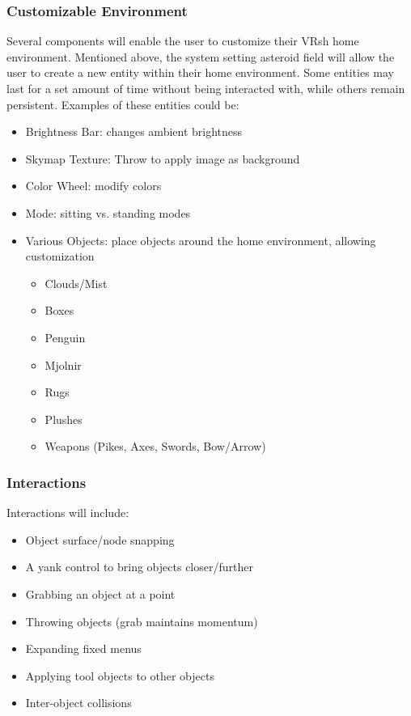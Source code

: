 \documentclass[titlepage,12pt]{article}
\newcommand\name{VRsh\xspace}
\begin{document}
\subsubsection{Customizable Environment}\label{sec:env}
Several components will enable the user to customize their \name home
environment. Mentioned above, the system setting asteroid field will 
allow the user to create a new entity within their home environment.
Some entities may last for a set amount of time without being interacted
with, while others remain persistent. Examples of these entities could be:
\begin{itemize}
    \item Brightness Bar: changes ambient brightness
    \item Skymap Texture: Throw to apply image as background
    \item Color Wheel: modify colors
    \item Mode: sitting vs. standing modes
    \item Various Objects: place objects around the home environment, allowing
        customization
        \begin{itemize}
            \item Clouds/Mist
            \item Boxes
            \item Penguin
            \item Mjolnir
            \item Rugs
            \item Plushes
            \item Weapons (Pikes, Axes, Swords, Bow/Arrow)
        \end{itemize}
\end{itemize}

\subsubsection{Interactions}

Interactions will include:
\begin{itemize}
    \item Object surface/node snapping
    \item A yank control to bring objects closer/further
    \item Grabbing an object at a point
    \item Throwing objects (grab maintains momentum)
    \item Expanding fixed menus
    \item Applying tool objects to other objects
    \item Inter-object collisions
\end{itemize}
\end{document}
